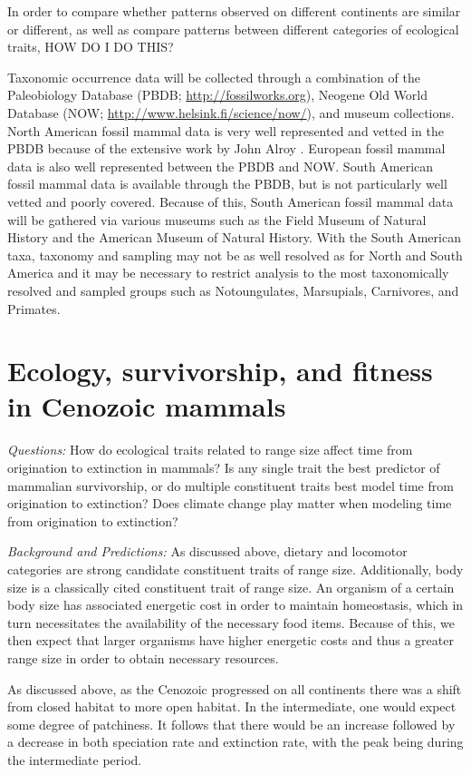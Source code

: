 \documentclass[12pt,letterpaper]{article}
\begin{document}
In order to compare whether patterns observed on different continents are similar or different, as well as compare patterns between different categories of ecological traits, HOW DO I DO THIS?

Taxonomic occurrence data will be collected through a combination of the Paleobiology Database (PBDB; \url{http://fossilworks.org}), Neogene Old World Database (NOW; \url{http://www.helsink.fi/science/now/}), and museum collections. North American fossil mammal data is very well represented and vetted in the PBDB because of the extensive work by John Alroy \citep{Alroy1996a,Alroy1998,Alroy2000g}. European fossil mammal data is also well represented between the PBDB and NOW. South American fossil mammal data is available through the PBDB, but is not particularly well vetted and poorly covered. Because of this, South American fossil mammal data will be gathered via various museums such as the Field Museum of Natural History and the American Museum of Natural History. With the South American taxa, taxonomy and sampling may not be as well resolved as for North and South America and it may be necessary to restrict analysis to the most taxonomically resolved and sampled groups such as Notoungulates, Marsupials, Carnivores, and Primates.


\section{Ecology, survivorship, and fitness in Cenozoic mammals}

\textit{Questions:} 
How do ecological traits related to range size affect time from origination to extinction in mammals? Is any single trait the best predictor of mammalian survivorship, or do multiple constituent traits best model time from origination to extinction? Does climate change play matter when modeling time from origination to extinction?

\textit{Background and Predictions:} 
As discussed above, dietary and locomotor categories are strong candidate constituent traits of range size. Additionally, body size is a classically cited constituent trait of range size. An organism of a certain body size has associated energetic cost in order to maintain homeostasis, which in turn necessitates the availability of the necessary food items. Because of this, we then expect that larger organisms have higher energetic costs and thus a greater range size in order to obtain necessary resources. 

As discussed above, as the Cenozoic progressed on all continents there was a shift from closed habitat to more open habitat. In the intermediate, one would expect some degree of patchiness. It follows that there would be an increase followed by a decrease in both speciation rate and extinction rate, with the peak being during the intermediate period.
\end{document}
